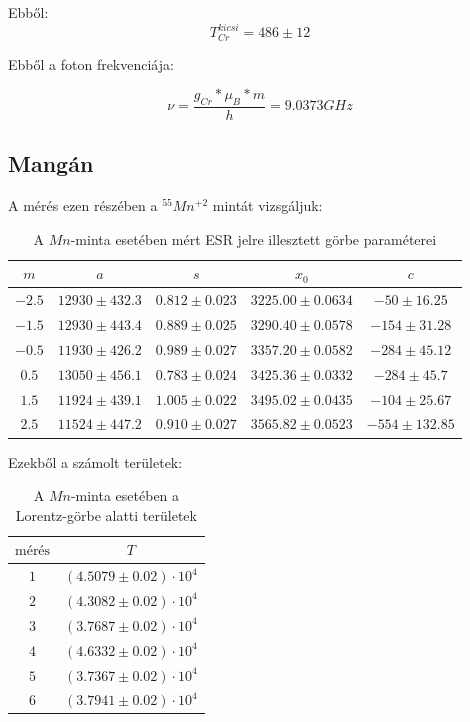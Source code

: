 \documentclass[a4paper,12pt]{article}
\begin{document}
Ebből:
\begin{equation}
 T_{Cr}^{kicsi}= 486 \pm 12
\end{equation}

Ebből a foton frekvenciája: 

\begin{equation}
\nu = \dfrac{g_{Cr}*\mu_{B}*m}{h} = 9.0373 GHz
\end{equation}

\subsection{Mangán}

A mérés ezen részében a $^{55}Mn^{+2}$ mintát vizsgáljuk:

\begin{table}[h!]
\begin{center}
\begin{tabular}{|c|c|c|c|c|}
 \hline
$m$ & $a$ & $s$ & $x_0$ & $c$ \\ \hline
$-2.5$ & $12930 \pm 432.3$ & $0.812 \pm 0.023$ & $3225.00 \pm 0.0634$ & $-50 \pm 16.25$ \\ \hline
$-1.5$ & $12930 \pm 443.4$ & $0.889 \pm 0.025$ & $3290.40 \pm 0.0578$ & $-154\pm 31.28$ \\ \hline
$-0.5$ & $11930 \pm 426.2$ & $0.989 \pm 0.027$ & $3357.20 \pm 0.0582$ & $-284\pm 45.12$ \\ \hline
$0.5$  & $13050 \pm 456.1$ & $0.783 \pm 0.024$ & $3425.36 \pm 0.0332$ & $-284\pm 45.7$ \\ \hline
$1.5$  & $11924 \pm 439.1$ & $1.005 \pm 0.022$ & $3495.02 \pm 0.0435$ & $-104\pm 25.67$ \\ \hline
$2.5$  & $11524 \pm 447.2$ & $0.910 \pm 0.027$ & $3565.82 \pm 0.0523$ & $-554\pm 132.85$ \\ \hline
\end{tabular}
\caption{A $Mn$-minta esetében mért ESR jelre illesztett görbe paraméterei}
\label{tab:1}
\end{center}
\end{table}

Ezekből a számolt területek:
\begin{table}[h!]
\begin{center}
\begin{tabular}{|c|c|}
 \hline
$\textrm{mérés}$ & $T$ \\ \hline
$1$ & $(4.5079 \pm 0.02) \cdot 10^4$ \\ \hline
$2$ & $(4.3082 \pm 0.02) \cdot 10^4$ \\ \hline
$3$ & $(3.7687 \pm 0.02) \cdot 10^4$ \\ \hline
$4$ & $(4.6332 \pm 0.02) \cdot 10^4$ \\ \hline
$5$ & $(3.7367 \pm 0.02) \cdot 10^4$ \\ \hline
$6$ & $(3.7941 \pm 0.02) \cdot 10^4$ \\ \hline
\end{tabular}
\caption{A $Mn$-minta esetében a Lorentz-görbe alatti területek}
\label{tab:2}
\end{center}
\end{table}
\end{document}
